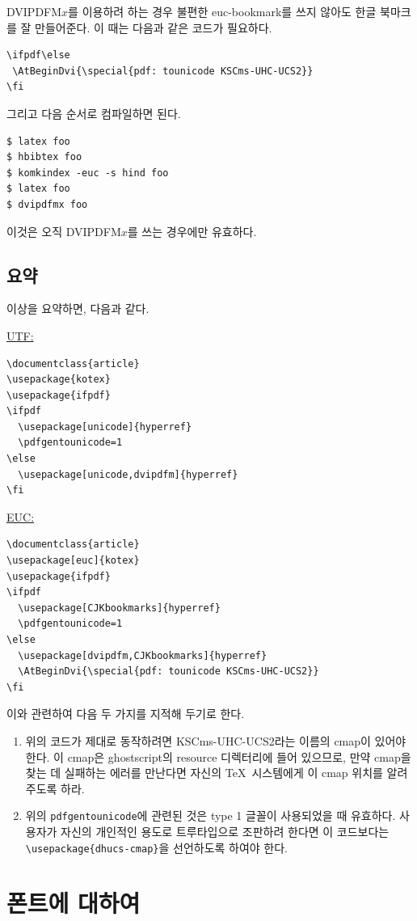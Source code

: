 DVIPDFM$x$를 이용하려 하는 경우 불편한 euc-bookmark를 쓰지 않아도
한글 북마크를 잘 만들어준다. 이 때는 다음과 같은 코드가 필요하다.
\begin{verbatim}
\ifpdf\else
 \AtBeginDvi{\special{pdf: tounicode KSCms-UHC-UCS2}}
\fi
\end{verbatim}
그리고 다음 순서로 컴파일하면 된다.
\begin{verbatim}
$ latex foo
$ hbibtex foo
$ komkindex -euc -s hind foo
$ latex foo
$ dvipdfmx foo
\end{verbatim}
이것은 오직 DVIPDFM$x$를 쓰는 경우에만 유효하다.

\subsection{요약}

이상을 요약하면, 다음과 같다.

\bigskip
\noindent\uline{UTF:}
\begin{verbatim}
\documentclass{article}
\usepackage{kotex}
\usepackage{ifpdf}
\ifpdf
  \usepackage[unicode]{hyperref}
  \pdfgentounicode=1
\else
  \usepackage[unicode,dvipdfm]{hyperref}
\fi
\end{verbatim}
\medskip
\noindent\uline{EUC:}
\begin{verbatim}
\documentclass{article}
\usepackage[euc]{kotex}
\usepackage{ifpdf}
\ifpdf
  \usepackage[CJKbookmarks]{hyperref}
  \pdfgentounicode=1
\else
  \usepackage[dvipdfm,CJKbookmarks]{hyperref}
  \AtBeginDvi{\special{pdf: tounicode KSCms-UHC-UCS2}}
\fi
\end{verbatim}

이와 관련하여 다음 두 가지를 지적해 두기로 한다.
\begin{enumerate}
\item 위의 코드가 제대로 동작하려면 KSCms-UHC-UCS2라는 이름의
cmap이 있어야 한다. 이 cmap은 ghostscript의 resource 디렉터리에
들어 있으므로, 만약 cmap을 찾는 데 실패하는 에러를 만난다면
자신의 \TeX\ 시스템에게 이 cmap 위치를 알려주도록 하라.
\item 위의 \texttt{pdfgentounicode}에 관련된 것은 type 1 글꼴이
사용되었을 때 유효하다. 사용자가 자신의 개인적인 용도로 트루타입으로
조판하려 한다면 이 코드보다는 \verb|\usepackage{dhucs-cmap}|을
선언하도록 하여야 한다.
\end{enumerate}

\section{폰트에 대하여}\label{sec:aboutfont}

